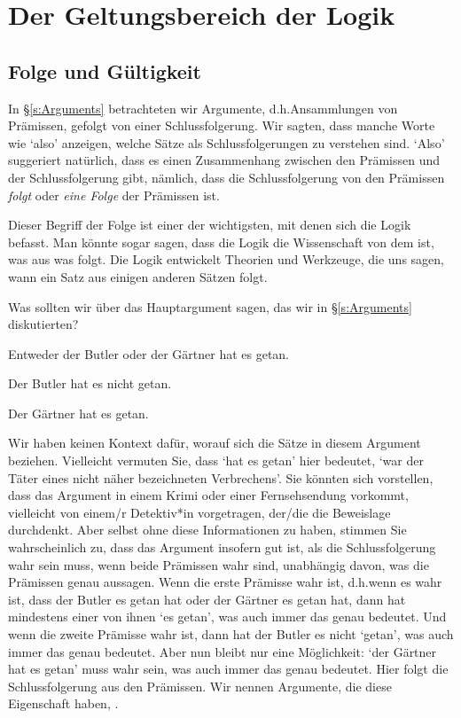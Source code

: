 \chapter{Der Geltungsbereich der Logik}
\label{s:Valid}

\section{Folge und Gültigkeit}

In \S\ref{s:Arguments} betrachteten wir Argumente, d.h.\@ Ansammlungen von Prämissen, gefolgt von einer Schlussfolgerung. Wir sagten, dass manche Worte wie `also' anzeigen, welche Sätze als Schlussfolgerungen zu verstehen sind. `Also' suggeriert natürlich, dass es einen Zusammenhang zwischen den Prämissen und der Schlussfolgerung gibt, nämlich, dass die Schlussfolgerung von den Prämissen \emph{folgt} oder \emph{eine Folge} der Prämissen ist.

Dieser Begriff der Folge ist einer der wichtigsten, mit denen sich die Logik befasst. Man könnte sogar sagen, dass die Logik die Wissenschaft von dem ist, was aus was folgt. Die Logik entwickelt Theorien und Werkzeuge, die uns sagen, wann ein Satz aus einigen anderen Sätzen folgt.

Was sollten wir über das Hauptargument sagen, das wir in \S\ref{s:Arguments} diskutierten? 
\begin{earg}
	\item[] Entweder der Butler oder der Gärtner hat es getan.
	\item[] Der Butler hat es nicht getan.
	\item[\therefore] Der Gärtner hat es getan.
\end{earg}
Wir haben keinen Kontext dafür, worauf sich die Sätze in diesem Argument beziehen. Vielleicht vermuten Sie, dass `hat es getan' hier bedeutet, `war der Täter eines nicht näher bezeichneten Verbrechens'. Sie könnten sich vorstellen, dass das Argument in einem Krimi oder einer Fernsehsendung vorkommt, vielleicht von einem/r Detektiv*in vorgetragen, der/die die Beweislage durchdenkt. Aber selbst ohne diese Informationen zu haben, stimmen Sie wahrscheinlich zu, dass das Argument insofern gut ist, als die Schlussfolgerung wahr sein muss, wenn beide Prämissen wahr sind, unabhängig davon, was die Prämissen genau aussagen. Wenn die erste Prämisse wahr ist, d.h.\@ wenn es wahr ist, dass der Butler es getan hat oder der Gärtner es getan hat, dann hat mindestens einer von ihnen `es getan', was auch immer das genau bedeutet. Und wenn die zweite Prämisse wahr ist, dann hat der Butler es nicht `getan', was auch immer das genau bedeutet. Aber nun bleibt nur eine Möglichkeit: `der Gärtner hat es getan' muss wahr sein, was auch immer das genau bedeutet. Hier folgt die Schlussfolgerung aus den Prämissen. Wir nennen Argumente, die diese Eigenschaft haben, .

